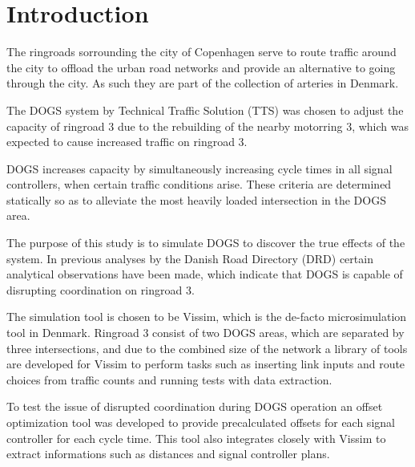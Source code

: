 \section{Introduction}

The ringroads sorrounding the city of Copenhagen serve to route traffic around the city to offload the urban road networks and provide an alternative to going through the city. As such they are part of the collection of arteries in Denmark.

The DOGS system by Technical Traffic Solution (TTS) was chosen to adjust the capacity of ringroad 3 due to the rebuilding of the nearby motorring 3, which was expected to cause increased traffic on ringroad 3.

DOGS increases capacity by simultaneously increasing cycle times in all signal controllers, when certain traffic conditions arise. These criteria are determined statically so as to alleviate the most heavily loaded intersection in the DOGS area.

The purpose of this study is to simulate DOGS to discover the true effects of the system. In previous analyses by the Danish Road Directory (DRD) certain analytical observations have been made, which indicate that DOGS is capable of disrupting coordination on ringroad 3.

The simulation tool is chosen to be Vissim, which is the de-facto microsimulation tool in Denmark. Ringroad 3 consist of two DOGS areas, which are separated by three intersections, and due to the combined size of the network a library of tools are developed for Vissim to perform tasks such as inserting link inputs and route choices from traffic counts and running tests with data extraction.

To test the issue of disrupted coordination during DOGS operation an offset optimization tool was developed to provide precalculated offsets for each signal controller for each cycle time. This tool also integrates closely with Vissim to extract informations such as distances and signal controller plans. 

